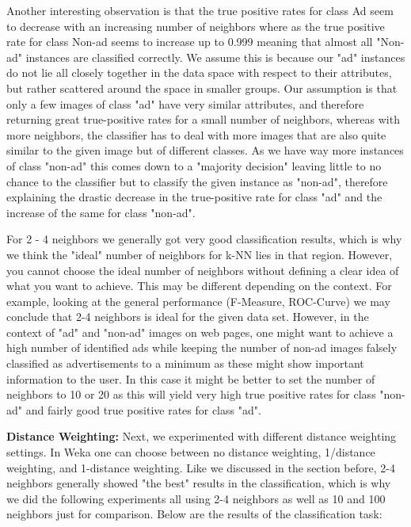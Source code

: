 \documentclass{article}
\begin{document}
Another interesting observation is that the true positive rates for class Ad seem to decrease with an increasing number of neighbors where as the true positive rate for class Non-ad seems to increase up to 0.999 meaning that almost all "Non-ad" instances are classified correctly. We assume this is because our "ad" instances do not lie all closely together in the data space with respect to their attributes, but rather scattered around the space in smaller groups. Our assumption is that only a few images of class "ad" have very similar attributes, and therefore returning great true-positive rates for a small number of neighbors, whereas with more neighbors, the classifier has to deal with more images that are also quite similar to the given image but of different classes. As we have way more instances of class "non-ad" this comes down to a "majority decision" leaving little to no chance to the classifier but to classify the given instance as "non-ad", therefore explaining the drastic decrease in the true-positive rate for class "ad" and the increase of the same for class "non-ad".

For 2 - 4 neighbors we generally got very good classification results, which is why we think the "ideal" number of neighbors for k-NN lies in that region. However, you cannot choose the ideal number of neighbors without defining a clear idea of what you want to achieve. This may be different depending on the context. For example, looking at the general performance (F-Measure, ROC-Curve) we may conclude that 2-4 neighbors is ideal for the given data set. However, in the context of "ad" and "non-ad" images on web pages, one might want to achieve a high number of identified ads while keeping the number of non-ad images falsely classified  as advertisements to a minimum as these might show important information to the user. In this case it might be better to set the number of neighbors to 10 or 20 as this will yield very high true positive rates for class "non-ad" and fairly good true positive rates for class "ad". 

\textbf{Distance Weighting:}
Next, we experimented with different distance weighting settings. In Weka one can choose between no distance weighting, 1/distance weighting, and 1-distance weighting. Like we discussed in the section before, 2-4 neighbors generally showed "the best" results in the classification, which is why we did the following experiments all using 2-4 neighbors as well as 10 and 100 neighbors just for comparison. Below are the results of the classification task:
\end{document}
